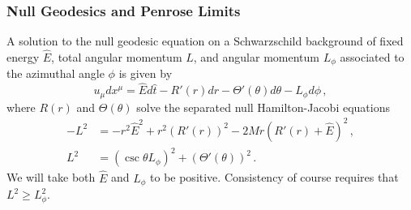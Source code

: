 \subsubsection{Null Geodesics and Penrose Limits}

A solution to the null geodesic equation on a Schwarzschild background of fixed energy $\hat{E}$, total angular momentum $L$, and angular momentum $L_{\phi}$ associated to the azimuthal angle $\phi$ is given by
\begin{equation}\label{Penrose:eqn:Su}
u_{\mu}dx^{\mu} = \hat{E}d\hat{t} - R'(r)dr - \Theta'(\theta)d\theta -L_{\phi} d\phi \, ,
\end{equation}
where $R(r)$ and $\Theta(\theta)$ solve the separated null Hamilton-Jacobi equations
\begin{equation}\label{Penrose:eqn:uschwarzschild}
\begin{aligned}
-L^2 &= -r^2 \hat{E}^2+r^2 \left(R'(r)\right)^2-2 M r \left(R'(r)+\hat{E}\right)^2 \, , \\
L^2 &= \left(\csc\theta L_{\phi}\right)^2+\left(\Theta'(\theta)\right)^2  \, .
\end{aligned}
\end{equation}
We will take both $\hat{E}$ and $L_{\phi}$ to be positive. Consistency of course requires that $L^2 \geq L_{\phi}^2$. %


